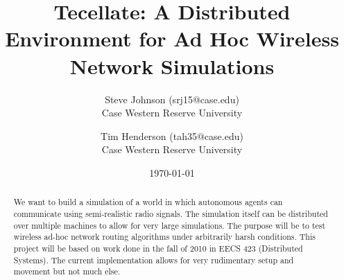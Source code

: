 \documentclass[12pt]{article}
\title{Tecellate: A Distributed Environment for Ad Hoc Wireless Network Simulations}
\author{
        Steve Johnson (srj15@case.edu)\\
        Case Western Reserve University\\
        \and Tim Henderson (tah35@case.edu)\\
        Case Western Reserve University
}
\date{\today}
\begin{document}
\doublespacing
\maketitle


\begin{abstract}
    We want to build a simulation of a world in which autonomous agents can communicate using semi-realistic radio signals. The simulation itself can be distributed over multiple machines to allow for very large simulations. The purpose will be to test wireless ad-hoc network routing algorithms under arbitrarily harsh conditions.
    This project will be based on work done in the fall of 2010 in EECS 423 (Distributed Systems). The current implementation allows for very rudimentary setup and movement but not much else.
\end{abstract}











\nocite{*}


\end{document}
